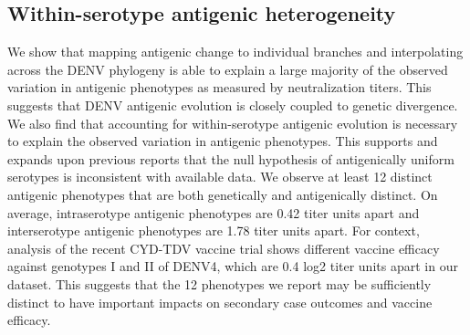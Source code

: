 \documentclass[11pt,oneside,letterpaper]{article}
\begin{document}
\subsection*{Within-serotype antigenic heterogeneity}
We show that mapping antigenic change to individual branches and interpolating across the DENV phylogeny is able to explain a large majority of the observed variation in antigenic phenotypes as measured by neutralization titers.
This suggests that DENV antigenic evolution is closely coupled to genetic divergence.
We also find that accounting for within-serotype antigenic evolution is necessary to explain the observed variation in antigenic phenotypes.
This supports and expands upon previous reports that the null hypothesis of antigenically uniform serotypes is inconsistent with available data.
We observe at least 12 distinct antigenic phenotypes that are both genetically and antigenically distinct.
On average, intraserotype antigenic phenotypes are 0.42 titer units apart and interserotype antigenic phenotypes are 1.78 titer units apart.
For context, analysis of the recent CYD-TDV vaccine trial shows different vaccine efficacy against genotypes I and II of DENV4, which are 0.4 log2 titer units apart in our dataset.
This suggests that the 12 phenotypes we report may be sufficiently distinct to have important impacts on secondary case outcomes and vaccine efficacy.
\end{document}
